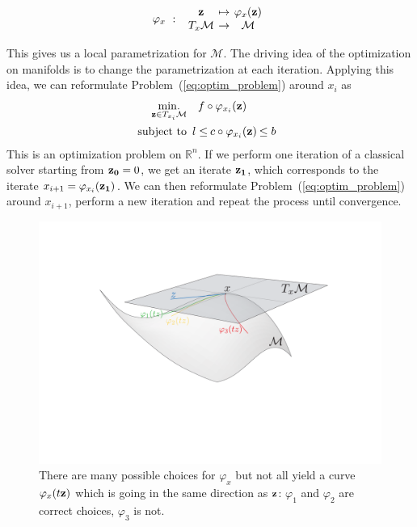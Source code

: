 \begin{equation}
  \varphi_x\ :\
  \begin{array}{ccc}
    \mathbf{z} & \reduce{\mapsto}{6} & \varphi_x(\mathbf{z}) \\
    T_x\mathcal{M} & \reduce{\rightarrow}{6} & \mathcal{M}
  \end{array} \nonumber
\end{equation}

This gives us a local parametrization for $\mathcal{M}$.
The driving idea of the optimization on manifolds is to change the parametrization at each iteration.
Applying this idea, we can reformulate Problem~(\ref{eq:optim_problem}) around $x_i$ as
\begin{align}
\label{eq:local_problem}
\minimize_{{\bf z} \in T_{x_i}\mathcal{M}} & \quad f \circ \varphi_{x_i}({\bf z}) \\
  \text{subject to}&
  \begin{array}{rcl}
    {l} \leq & \reduce{c \circ \varphi_{x_i}({\bf z})}{8}& \leq {b} \nonumber
  \end{array}
\end{align}
This is an optimization problem on $\mathbb{R}^n$.
If we perform one iteration of a classical solver starting from ${\bf z_0} = 0$, we get an iterate ${\bf z_1}$, which corresponds to the iterate $x_{i+1} = \varphi_{x_i}({\bf z_1})$.
We can then reformulate Problem~(\ref{eq:optim_problem}) around $x_{i+1}$, perform a new iteration and repeat the process until convergence.

\begin{figure}[!htb]
  \centering
  \includegraphics[width=.9\linewidth]{Humanoids2015/manifold.pdf}
  \caption{There are many possible choices for $\varphi_{x}$ but not all yield a curve $\varphi_{x}(t{\bf z})$ which is going in the same direction as ${\bf z}$: $\varphi_{1}$ and $\varphi_{2}$ are correct choices, $\varphi_{3}$ is not.}
\label{fig:phimap}
\end{figure}

